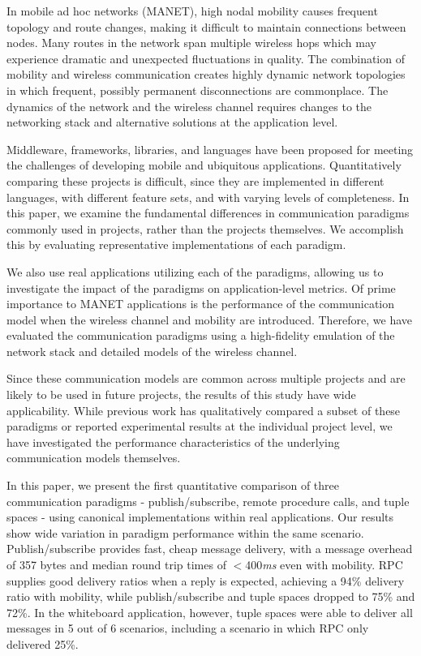 \documentclass[lnicst]{svmultln}
\begin{document}
In mobile ad hoc networks (MANET), high nodal mobility causes frequent topology and route changes, making it difficult to maintain connections between nodes. Many routes in the network span multiple wireless hops which may experience dramatic and unexpected fluctuations in quality. The combination of mobility and wireless communication creates highly dynamic network topologies in which frequent, possibly permanent disconnections are commonplace. The dynamics of the network and the wireless channel requires changes to the networking stack and alternative solutions at the application level.

Middleware, frameworks, libraries, and languages have been proposed for meeting the challenges of developing mobile and ubiquitous applications. Quantitatively comparing these projects is difficult, since they are implemented in different languages, with different feature sets, and with varying levels of completeness. In this paper, we examine the fundamental differences in communication paradigms commonly used in projects, rather than the projects themselves. We accomplish this by evaluating representative implementations of each paradigm.

We also use real applications utilizing each of the paradigms, allowing us to investigate the impact of the paradigms on application-level metrics. Of prime importance to MANET applications is the performance of the communication model when the wireless channel and mobility are introduced. Therefore, we have evaluated the communication paradigms using a high-fidelity emulation of the network stack and detailed models of the wireless channel.

Since these communication models are common across multiple projects and are likely to be used in future projects, the results of this study have wide applicability. While previous work has qualitatively compared a subset of these paradigms or reported experimental results at the individual project level, we have investigated the performance characteristics of the underlying communication models themselves.

In this paper, we present the first quantitative comparison of three communication paradigms - publish/subscribe\cite{psfaces}, remote procedure calls\cite{rpc}, and tuple spaces\cite{linda} - using canonical implementations within real applications. Our results show wide variation in paradigm performance within the same scenario. Publish/subscribe provides fast, cheap message delivery, with a message overhead of 357 bytes and median round trip times of $<$400\textit{ms} even with mobility. RPC supplies good delivery ratios when a reply is expected, achieving a 94\% delivery ratio with mobility, while publish/subscribe and tuple spaces dropped to 75\% and 72\%. In the whiteboard application, however, tuple spaces were able to deliver all messages in 5 out of 6 scenarios, including a scenario in which RPC only delivered 25\%.
\end{document}
